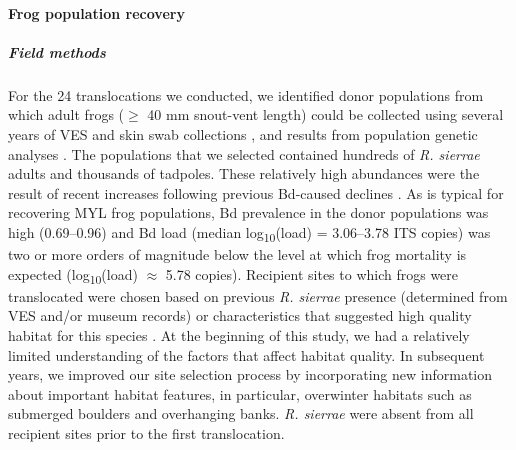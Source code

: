 \documentclass[
  letterpaper,
  DIV=11,
  numbers=noendperiod]{scrartcl}
\let\oldparagraph\paragraph
\renewcommand{\paragraph}[1]{\oldparagraph{#1}\mbox{}}
\let\oldsubparagraph\subparagraph
\renewcommand{\subparagraph}[1]{\oldsubparagraph{#1}\mbox{}}
\begin{document}
\hypertarget{frog-population-recovery-1}{%
\paragraph{Frog population recovery}\label{frog-population-recovery-1}}

\hypertarget{field-methods}{%
\subparagraph{Field methods}\label{field-methods}}

For the 24 translocations we conducted, we identified donor populations
from which adult frogs (\(\geq\) 40 mm snout-vent length) could be
collected using several years of VES and skin swab collections
\citep{knapp2016}, and results from population genetic analyses
\citep{poorten2017}. The populations that we selected contained hundreds
of \emph{R. sierrae} adults and thousands of tadpoles. These relatively
high abundances were the result of recent increases following previous
Bd-caused declines \citep{knapp2016}. As is typical for recovering MYL
frog populations, Bd prevalence in the donor populations was high
(0.69--0.96) and Bd load (median log\textsubscript{10}(load) =
3.06--3.78 ITS copies) was two or more orders of magnitude below the
level at which frog mortality is expected (log\textsubscript{10}(load)
\(\approx\) 5.78 copies)\citep{vredenburg2010, joseph2018}. Recipient
sites to which frogs were translocated were chosen based on previous
\emph{R. sierrae} presence (determined from VES and/or museum records)
or characteristics that suggested high quality habitat for this species
\citep{knapp2005}. At the beginning of this study, we had a relatively
limited understanding of the factors that affect habitat quality. In
subsequent years, we improved our site selection process by
incorporating new information about important habitat features, in
particular, overwinter habitats such as submerged boulders and
overhanging banks. \emph{R. sierrae} were absent from all recipient
sites prior to the first translocation.
\end{document}
